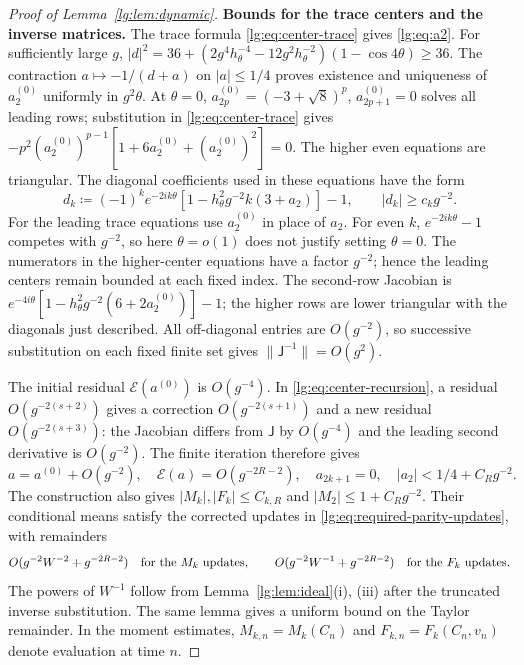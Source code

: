 \documentclass[11pt]{article}
\numberwithin{equation}{section}
\theoremstyle{remark}
\begin{document}
\begin{proof}[Proof of Lemma~\ref{lg:lem:dynamic}]
\noindent\textbf{Bounds for the trace centers and the inverse matrices.}
The trace formula \eqref{lg:eq:center-trace} gives
\eqref{lg:eq:a2}. For sufficiently large $g$,
$|d|^2=36+(2g^4h_\theta^{-4}-12g^2h_\theta^{-2})(1-\cos4\theta)\ge36$.
The contraction $a\mapsto-1/(d+a)$ on $|a|\le1/4$ proves existence
and uniqueness of $a_2^{(0)}$ uniformly in $g^2\theta$.
At $\theta=0$, $a_{2p}^{(0)}=(-3+\sqrt8)^p$, $a_{2p+1}^{(0)}=0$
solves all leading rows; substitution in \eqref{lg:eq:center-trace}
gives $-p^2(a_2^{(0)})^{p-1}[1+6a_2^{(0)}+(a_2^{(0)})^2]=0$.
The higher even equations are triangular. The diagonal coefficients
used in these equations have the form
\begin{equation}\label{lg:eq:center-denominators}
 d_k\coloneqq (-1)^ke^{-2ik\theta}[1-h_\theta^2g^{-2} k(3+a_2)]-1,\qquad
 |d_k|\ge c_kg^{-2}.
\end{equation}
For the leading trace equations use $a_2^{(0)}$ in place of $a_2$.
For even $k$, $e^{-2ik\theta}-1$ competes with $g^{-2}$, so here
$\theta=o(1)$ does not justify setting $\theta=0$.
The numerators in the higher-center equations have a factor $g^{-2}$;
hence the leading centers remain bounded at each fixed index.
The second-row Jacobian is
$e^{-4i\theta}[1-h_\theta^2g^{-2}(6+2a_2^{(0)})]-1$;
the higher rows are lower triangular with the diagonals just described.
All off-diagonal entries are $O(g^{-2})$, so successive substitution
on each fixed finite set gives $\|\mathsf J^{-1}\|=O(g^2)$.

The initial residual $\mathcal E(a^{(0)})$ is $O(g^{-4})$.
In \eqref{lg:eq:center-recursion}, a residual $O(g^{-2(s+2)})$
gives a correction $O(g^{-2(s+1)})$ and a new residual
$O(g^{-2(s+3)})$: the Jacobian differs from $\mathsf J$ by $O(g^{-4})$
and the leading second derivative is $O(g^{-2})$.
The finite iteration therefore gives
\begin{equation}\label{lg:eq:centers}
 a=a^{(0)}+O(g^{-2}),\quad
 \mathcal E(a)=O(g^{-2R-2}),\quad a_{2k+1}=0,
 \quad |a_2|<1/4+C_Rg^{-2}.
\end{equation}
The construction also gives $|M_k|,|F_k|\le C_{k,R}$ and
$|M_2|\le1+C_Rg^{-2}$. Their conditional means satisfy the corrected updates
in \eqref{lg:eq:required-parity-updates}, with remainders
\begin{equation}\label{lg:eq:widtherrors}
 O(g^{-2} W^{-2}+g^{-2R-2})\quad\hbox{for the }M_k\hbox{ updates},\qquad
 O(g^{-2} W^{-1}+g^{-2R-2})\quad\hbox{for the }F_k\hbox{ updates}.
\end{equation}
The powers of $W^{-1}$ follow from Lemma~\ref{lg:lem:ideal}(i), (iii)
after the truncated inverse substitution. The same lemma gives
a uniform bound on the Taylor remainder.
In the moment estimates, $M_{k,n}=M_k(C_n)$ and
$F_{k,n}=F_k(C_n,v_n)$ denote evaluation at time $n$.


\end{proof}
\end{document}
